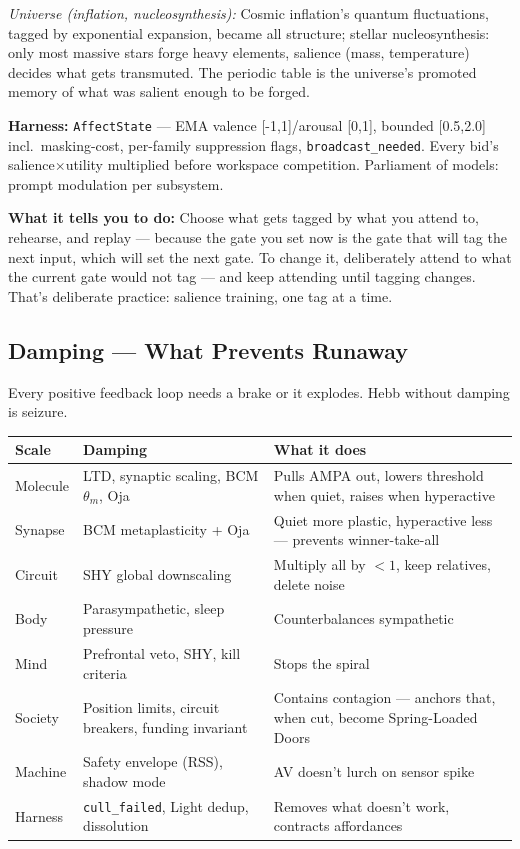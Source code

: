 \documentclass[11pt]{article}
\begin{document}
\textit{Universe (inflation, nucleosynthesis):} Cosmic inflation's quantum fluctuations, tagged by exponential expansion, became all structure; stellar nucleosynthesis: only most massive stars forge heavy elements, salience (mass, temperature) decides what gets transmuted. The periodic table is the universe's promoted memory of what was salient enough to be forged.


\textbf{Harness:} \texttt{AffectState} --- EMA valence [-1,1]/arousal [0,1], bounded [0.5,2.0] incl.\ masking-cost, per-family suppression flags, \texttt{broadcast\_needed}. Every bid's salience$\times$utility multiplied before workspace competition. Parliament of models: prompt modulation per subsystem.

\textbf{What it tells you to do:} Choose what gets tagged by what you attend to, rehearse, and replay --- because the gate you set now is the gate that will tag the next input, which will set the next gate. To change it, deliberately attend to what the current gate would not tag --- and keep attending until tagging changes. That's deliberate practice: salience training, one tag at a time.

\subsection{Damping --- What Prevents Runaway}

Every positive feedback loop needs a brake or it explodes. Hebb without damping is seizure.

\begin{center}
\small
\begin{tabular}{p{2.2cm}p{4.0cm}p{4.9cm}}
\toprule
Scale & Damping & What it does \\
\midrule
Molecule & LTD, synaptic scaling, BCM $\theta_m$, Oja & Pulls AMPA out, lowers threshold when quiet, raises when hyperactive \\
Synapse & BCM metaplasticity + Oja & Quiet more plastic, hyperactive less --- prevents winner-take-all \\
Circuit & SHY global downscaling & Multiply all by $<1$, keep relatives, delete noise \\
Body & Parasympathetic, sleep pressure & Counterbalances sympathetic \\
Mind & Prefrontal veto, SHY, kill criteria & Stops the spiral \\
Society & Position limits, circuit breakers, funding invariant & Contains contagion --- anchors that, when cut, become Spring-Loaded Doors \\
Machine & Safety envelope (RSS), shadow mode & AV doesn't lurch on sensor spike \\
Harness & \texttt{cull\_failed}, Light dedup, dissolution & Removes what doesn't work, contracts affordances \\
\bottomrule
\end{tabular}
\end{center}
\end{document}
